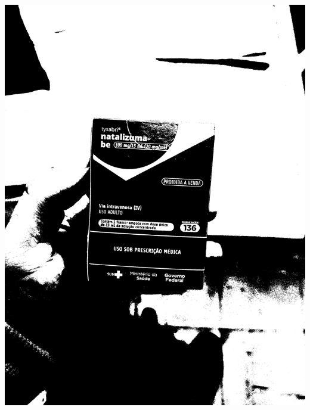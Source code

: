 \begin{frame}
\begin{columns}
\begin{column}{0.24\textwidth}
			\includegraphics[height=0.35\textheight]{../pictures/tysabri_g_thresh_recomposed_cmyk.jpg}
			\\\vspace{\floatsep}

\end{column}
\end{columns}
\end{frame}
